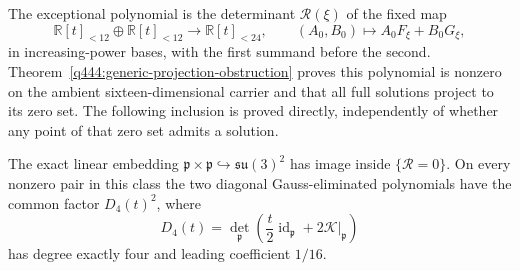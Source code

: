 The exceptional polynomial is the determinant $\mathscr R(\xi)$ of the
fixed map
\begin{equation}
\mathbb R[t]_{<12}\oplus\mathbb R[t]_{<12}\longrightarrow
\mathbb R[t]_{<24},\qquad (A_0,B_0)\longmapsto A_0F_\xi+B_0G_\xi,
\label{q444:twocross:eq:fixed-map}
\end{equation}
in increasing-power bases, with the first summand before the second.
Theorem~\ref{q444:generic-projection-obstruction} proves this polynomial
is nonzero on the ambient sixteen-dimensional carrier and that all full
solutions project to its zero set. The following inclusion is proved directly, independently
of whether any point of that zero set admits a solution.

\begin{proposition}\label{q444:twocross:prop:exceptional-inclusion}
The exact linear embedding $\mathfrak p\times\mathfrak p\hookrightarrow\mathfrak{su}(3)^2$ has image
inside $\{\mathscr R=0\}$. On every nonzero pair in this class the two
diagonal Gauss-eliminated polynomials have the common factor $D_4(t)^2$,
where
\[
D_4(t)=\det_{\mathfrak p}\left(\frac t2\operatorname{id}_{\mathfrak p}+2\mathcal K|_{\mathfrak p}\right)
\]
has degree exactly four and leading coefficient $1/16$.
\end{proposition}
